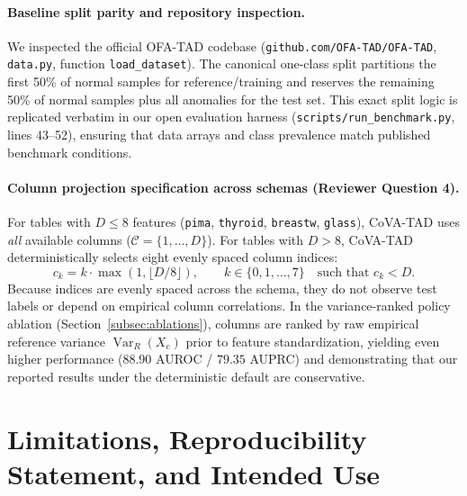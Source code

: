 \documentclass{article}
\begin{document}
\paragraph{Baseline split parity and repository inspection.}
We inspected the official OFA-TAD codebase (\texttt{github.com/OFA-TAD/OFA-TAD}, \texttt{data.py}, function \texttt{load\_dataset}). The canonical one-class split partitions the first 50\% of normal samples for reference/training and reserves the remaining 50\% of normal samples plus all anomalies for the test set. This exact split logic is replicated verbatim in our open evaluation harness (\texttt{scripts/run\_benchmark.py}, lines 43--52), ensuring that data arrays and class prevalence match published benchmark conditions.

\paragraph{Column projection specification across schemas (Reviewer Question 4).}
For tables with $D \leq 8$ features (\texttt{pima}, \texttt{thyroid}, \texttt{breastw}, \texttt{glass}), CoVA-TAD uses \emph{all} available columns ($\mathcal{C} = \{1, \dots, D\}$). For tables with $D > 8$, CoVA-TAD deterministically selects eight evenly spaced column indices:
\begin{equation}
  c_k = k \cdot \max(1, \lfloor D / 8 \rfloor), \qquad k \in \{0, 1, \dots, 7\} \quad \text{such that } c_k < D.
\end{equation}
Because indices are evenly spaced across the schema, they do not observe test labels or depend on empirical column correlations. In the variance-ranked policy ablation (Section~\ref{subsec:ablations}), columns are ranked by raw empirical reference variance $\operatorname{Var}_R(X_c)$ prior to feature standardization, yielding even higher performance ($88.90$ AUROC / $79.35$ AUPRC) and demonstrating that our reported results under the deterministic default are conservative.

\section{Limitations, Reproducibility Statement, and Intended Use}
\label{app:limitations}
\end{document}
